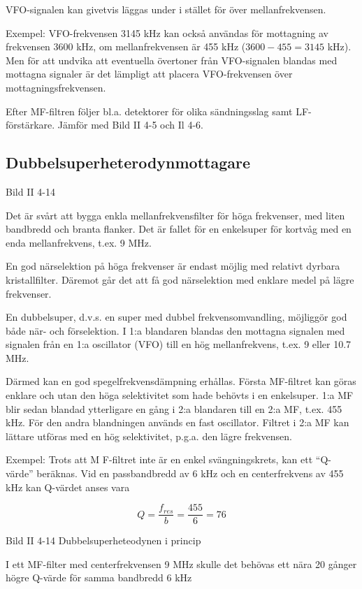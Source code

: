 VFO-signalen kan givetvis läggas under i stället för över
mellanfrekvensen.

Exempel: VFO-frekvensen 3145 kHz kan också användas för mottagning av
frekvensen 3600 kHz, om mellanfrekvensen är 455 kHz (\(3600 - 455 =
3145\) kHz). Men för att undvika att eventuella övertoner från
VFO-signalen blandas med mottagna signaler är det lämpligt att placera
VFO-frekvensen över mottagningsfrekvensen.

Efter MF-filtren följer bl.a. detektorer för olika sändningsslag samt
LF-förstärkare.  Jämför med Bild II 4-5 och Il 4-6.

\subsection{Dubbelsuperheterodynmottagare}

Bild II 4-14

Det är svårt att bygga enkla mellanfrekvensfilter för höga frekvenser,
med liten bandbredd och branta flanker. Det är fallet för en
enkelsuper för kortvåg med en enda mellanfrekvens, t.ex. 9 MHz.

En god närselektion på höga frekvenser är endast möjlig med relativt
dyrbara kristallfilter. Däremot går det att få god närselektion med
enklare medel på lägre frekvenser.

En dubbelsuper, d.v.s. en super med dubbel frekvensomvandling,
möjliggör god både när- och förselektion. I 1:a blandaren blandas den
mottagna signalen med signalen från en 1:a oscillator (VFO) till en
hög mellanfrekvens, t.ex. 9 eller 10.7 MHz.

Därmed kan en god spegelfrekvensdämpning erhållas. Första MF-filtret
kan göras enklare och utan den höga selektivitet som hade behövts i en
enkelsuper. 1:a MF blir sedan blandad ytterligare en gång i 2:a
blandaren till en 2:a MF, t.ex. 455 kHz. För den andra blandningen
används en fast oscillator. Filtret i 2:a MF kan lättare utföras med
en hög selektivitet, p.g.a. den lägre frekvensen.

Exempel: Trots att M F-filtret inte är en enkel svängningskrets, kan
ett ``Q-värde'' beräknas. Vid en passbandbredd av 6 kHz och en
centerfrekvens av 455 kHz kan Q-värdet anses vara

\[ Q = \frac{f_{res}}{b} = \frac{455}{6} = 76 \]

Bild II 4-14 Dubbelsuperheteodynen i princip

I ett MF-filter med centerfrekvensen 9
MHz skulle det behövas ett nära 20 gånger
högre Q-värde för samma bandbredd 6 kHz

